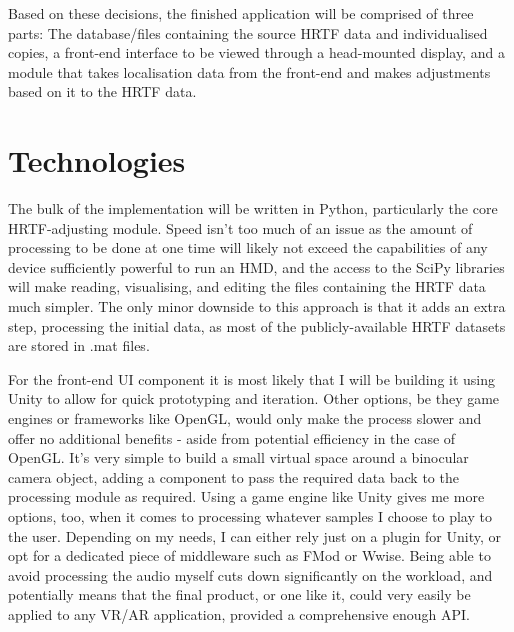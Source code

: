 \documentclass[10pt, oneside, a4paper, draft]{scrartcl}
\begin{document}
Based on these decisions, the finished application will be comprised of three parts: The database/files containing the source HRTF data and individualised copies, a front-end interface to be viewed through a head-mounted display, and a module that takes localisation data from the front-end and makes adjustments based on it to the HRTF data. 

\section*{Technologies}

The bulk of the implementation will be written in Python, particularly the core HRTF-adjusting module. Speed isn't too much of an issue as the amount of processing to be done at one time will likely not exceed the capabilities of any device sufficiently powerful to run an HMD, and the access to the SciPy libraries\citep{Jones1} will make reading, visualising, and editing the files containing the HRTF data much simpler. The only minor downside to this approach is that it adds an extra step, processing the initial data, as most of the publicly-available HRTF datasets are stored in .mat files.


For the front-end UI component it is most likely that I will be building it using Unity to allow for quick prototyping and iteration. Other options, be they game engines or frameworks like OpenGL, would only make the process slower and offer no additional benefits - aside from potential efficiency in the case of OpenGL. It's very simple to build a small virtual space around a binocular camera object, adding a component to pass the required data back to the processing module as required. Using a game engine like Unity gives me more options, too, when it comes to processing whatever samples I choose to play to the user. Depending on my needs, I can either rely just on a plugin for Unity, or opt for a dedicated piece of middleware such as FMod or Wwise. Being able to avoid processing the audio myself cuts down significantly on the workload, and potentially means that the final product, or one like it, could very easily be applied to any VR/AR application, provided a comprehensive enough API.
\end{document}
